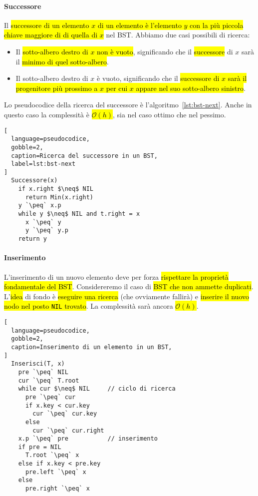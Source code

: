 \documentclass[a4paper,11pt,oneside]{article}
\theoremstyle{plain}
\theoremstyle{definition}
\theoremstyle{remark}
\newcommand{\peq}{$\gets$}
\begin{document}
\paragraph{Successore} Il \hl{successore di un elemento $x$ di un elemento è
l'elemento $y$ con la più piccola chiave maggiore di di quella di $x$} nel BST.
Abbiamo due casi possibili di ricerca:

\begin{itemize}
  \item Il \hl{sotto-albero destro di $x$ non è vuoto}, significando che il
    \hl{successore} di $x$ sarà il \hl{minimo di quel sotto-albero}.
  \item Il sotto-albero destro di $x$ è vuoto, significando che il
    \hl{successore di $x$ sarà il progenitore più prossimo a $x$ per cui $x$
    appare nel suo sotto-albero sinistro}.
\end{itemize}

\noindent Lo pseudocodice della ricerca del successore è
l'algoritmo~\ref{lst:bst-next}. Anche in questo caso la complessità è
\hl{$\mathcal{O}(h)$}, sia nel caso ottimo che nel pessimo.

\begin{lstlisting}[
  language=pseudocodice,
  gobble=2,
  caption=Ricerca del successore in un BST,
  label=lst:bst-next
]
  Successore(x)
    if x.right $\neq$ NIL
      return Min(x.right)
    y `\peq` x.p
    while y $\neq$ NIL and t.right = x
      x `\peq` y
      y `\peq` y.p
    return y
\end{lstlisting}

\paragraph{Inserimento} L'inserimento di un nuovo elemento deve per forza
\hl{rispettare la proprietà fondamentale del BST}. Considereremo il caso di
\hl{BST che non ammette duplicati}. L'\hl{idea} di fondo è \hl{eseguire una
ricerca} (che ovviamente fallirà) e \hl{inserire il nuovo nodo nel posto
\texttt{NIL} trovato}. La complessità sarà ancora \hl{$\mathcal{O}(h)$}.

\begin{lstlisting}[
  language=pseudocodice,
  gobble=2,
  caption=Inserimento di un elemento in un BST,
]
  Inserisci(T, x)
    pre `\peq` NIL
    cur `\peq` T.root
    while cur $\neq$ NIL     // ciclo di ricerca
      pre `\peq` cur
      if x.key < cur.key
        cur `\peq` cur.key
      else
        cur `\peq` cur.right
    x.p `\peq` pre           // inserimento
    if pre = NIL
      T.root `\peq` x
    else if x.key < pre.key
      pre.left `\peq` x
    else
      pre.right `\peq` x
\end{lstlisting}
\end{document}

